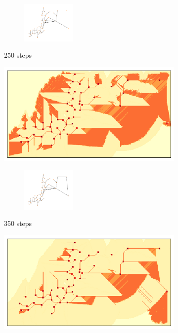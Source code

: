 \documentclass[11pt]{article}
\begin{document}
\begin{figure}[H]
\begin{subfigure}{0.24\textwidth}
\begin{subfigure}{0.24\textwidth}
	    \centering
	    \hspace*{-1cm}
	    \includegraphics[width=100px]{250g.png}
	\end{subfigure}
        \caption{250 steps}
    \end{subfigure}\hfill
    \begin{subfigure}{0.24\textwidth}
        \centering
        \includegraphics[width=\linewidth]{350.png}
	\begin{subfigure}{0.24\textwidth}
	    \centering
	    \hspace*{-1cm}
	    \includegraphics[width=100px]{350g.png}
	\end{subfigure}
        \caption{350 steps}
    \end{subfigure}
    \begin{subfigure}{0.24\textwidth}
        \centering
        \includegraphics[width=\linewidth]{550.png}

\end{subfigure}
\end{figure}
\end{document}
